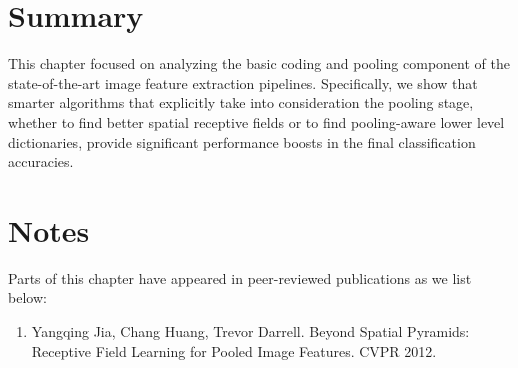 \section{Summary}

This chapter focused on analyzing the basic coding and pooling component of the state-of-the-art image feature extraction pipelines. Specifically, we show that smarter algorithms that explicitly take into consideration the pooling stage, whether to find better spatial receptive fields or to find pooling-aware lower level dictionaries, provide significant performance boosts in the final classification accuracies.

\section*{Notes}

Parts of this chapter have appeared in peer-reviewed publications as we list below:
\begin{enumerate}
\item Yangqing Jia, Chang Huang, Trevor Darrell. Beyond Spatial Pyramids: Receptive Field Learning for Pooled Image Features. CVPR 2012.
\end{enumerate}